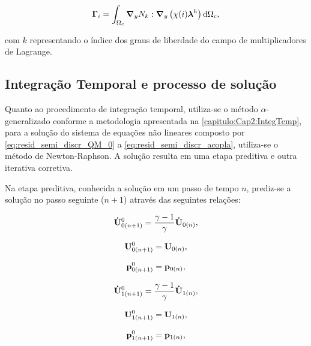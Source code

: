 \begin{align}
	\mathbf{\Gamma}_{i} = \int_{\Omega_c} \boldsymbol{\nabla}_y N_{k} : \boldsymbol{\nabla}_y \left(\chi (i) \boldsymbol{\lambda}^h\right)    \mathrm{d} \Omega_c,
\end{align}

\noindent com $k$ representando o índice dos graus de liberdade do campo de multiplicadores de Lagrange.

\subsection{Integração Temporal e processo de solução}

Quanto ao procedimento de integração temporal, utiliza-se o método $\alpha$-generalizado conforme a metodologia apresentada na \autoref{capitulo:Cap2:IntegTemp}, para a solução do sistema de equações não lineares composto por \autoref{eq:resid_semi_discr_QM_0} a \autoref{eq:resid_semi_discr_acopla}, utiliza-se o método de Newton-Raphson. A solução resulta em uma etapa preditiva e outra iterativa corretiva.

Na etapa preditiva, conhecida a solução em um passo de tempo $n$, prediz-se a solução no passo seguinte ($n+1$) através das seguintes relações:

\begin{align}
	\mathbf{\dot{U}}_{0(n+1)}^{0} = \frac{\gamma-1}{\gamma}\mathbf{\dot{U}}_{0(n)} \label{eq:pred_acel_0},
\end{align}

\begin{align}
	\mathbf{U}_{0(n+1)}^{0} = \mathbf{U}_{0(n)}, \label{eq:pred_vel_0}
\end{align}

\begin{align}
	\mathbf{p}_{0(n+1)}^{0} = \mathbf{p}_{0(n)},\label{eq:pred_press_0}
\end{align}

\begin{align}
	\mathbf{\dot{U}}_{1(n+1)}^{0} = \frac{\gamma-1}{\gamma}\mathbf{\dot{U}}_{1(n)} \label{eq:pred_acel_1},
\end{align}

\begin{align}
	\mathbf{U}_{1(n+1)}^{0} = \mathbf{U}_{1(n)}, \label{eq:pred_vel_1}
\end{align}

\begin{align}
	\mathbf{p}_{1(n+1)}^{0} = \mathbf{p}_{1(n)},\label{eq:pred_press_1}
\end{align}

